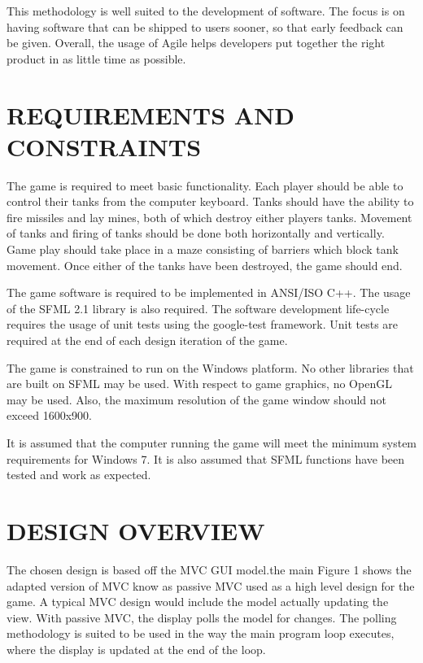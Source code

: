 \documentclass[10pt,twocolumn]{witseiepaper}
\begin{document}
This methodology is well suited to the development of software. The focus is on having software that can be shipped to users sooner, so that early feedback can be given. Overall, the usage of Agile helps developers put together the right product in as little time as possible.

%
\section{REQUIREMENTS AND CONSTRAINTS}%
The game is required to meet basic functionality. Each player should be able to control their tanks from the computer keyboard. Tanks should have the ability to fire missiles and lay mines, both of which destroy either players tanks. Movement of tanks and firing of tanks should be done both horizontally and vertically. Game play should take place in a maze consisting of barriers which block tank movement. Once either of the tanks have been destroyed, the game should end.

The game software is required to be implemented in ANSI/ISO C++. The usage of the SFML 2.1 library is also required. The software development life-cycle requires the usage of unit tests using the google-test framework. Unit tests are required at the end of each design iteration of the game.

The game is constrained to run on the Windows platform. No other libraries that are built on SFML may be used. With respect to game graphics, no OpenGL may be used. Also, the maximum resolution of the game window should not exceed 1600x900. 

It is assumed that the computer running the game will meet the minimum system requirements for Windows 7. It is also assumed that SFML functions have been tested and work as expected.

%
\section{DESIGN OVERVIEW} %
The chosen design is based off the MVC GUI model.the main Figure 1 shows the adapted version of MVC know as passive MVC used as a high level design for the game. A typical MVC design would include the model actually updating the view. With passive MVC, the display polls the model for changes. The polling methodology is suited to be used in the way the main program loop executes, where the display is updated at the end of the loop. 
\end{document}
